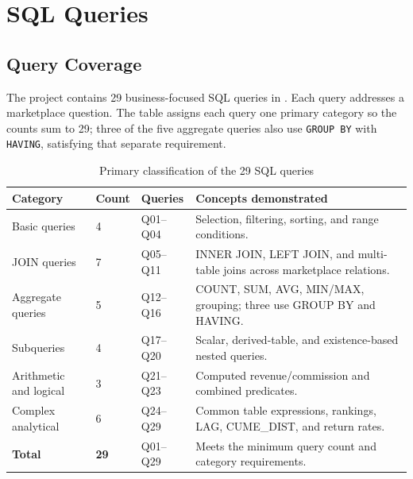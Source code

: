 \documentclass[11pt,a4paper,oneside]{report}
\newcommand{\projectpath}[1]{\path{#1}}
\begin{document}
\chapter{SQL Queries}
\section{Query Coverage}
The project contains 29 business-focused SQL queries in \projectpath{sql/04_queries.sql}. Each query addresses a marketplace question. The table assigns each query one primary category so the counts sum to 29; three of the five aggregate queries also use \texttt{GROUP BY} with \texttt{HAVING}, satisfying that separate requirement.

\begin{table}[htbp]\centering
\caption{Primary classification of the 29 SQL queries}
\begin{tabularx}{\textwidth}{P{0.26\textwidth}P{0.11\textwidth}P{0.20\textwidth}Y}
\toprule
\textbf{Category} & \textbf{Count} & \textbf{Queries} & \textbf{Concepts demonstrated}\\\midrule
Basic queries & 4 & Q01--Q04 & Selection, filtering, sorting, and range conditions.\\
JOIN queries & 7 & Q05--Q11 & INNER JOIN, LEFT JOIN, and multi-table joins across marketplace relations.\\
Aggregate queries & 5 & Q12--Q16 & COUNT, SUM, AVG, MIN/MAX, grouping; three use GROUP BY and HAVING.\\
Subqueries & 4 & Q17--Q20 & Scalar, derived-table, and existence-based nested queries.\\
Arithmetic and logical & 3 & Q21--Q23 & Computed revenue/commission and combined predicates.\\
Complex analytical & 6 & Q24--Q29 & Common table expressions, rankings, LAG, CUME\_DIST, and return rates.\\\midrule
\textbf{Total} & \textbf{29} & Q01--Q29 & Meets the minimum query count and category requirements.\\
\bottomrule
\end{tabularx}
\end{table}
\end{document}
